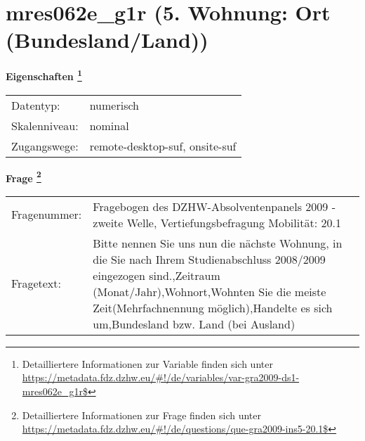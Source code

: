 
    \setcounter{footnote}{0}

    \vspace*{-1.8cm}
	\section{mres062e\_g1r (5. Wohnung: Ort (Bundesland/Land))}
	\label{section:mres062e_g1r}



    \vspace*{0.5cm}
    \noindent\textbf{Eigenschaften
	\footnote{Detailliertere Informationen zur Variable finden sich unter
		\url{https://metadata.fdz.dzhw.eu/\#!/de/variables/var-gra2009-ds1-mres062e_g1r$}}}\\
	\begin{tabularx}{\hsize}{@{}lX}
	Datentyp: & numerisch \\
	Skalenniveau: & nominal \\
	Zugangswege: &
	  remote-desktop-suf, 
	  onsite-suf
 \\
    \end{tabularx}



				\vspace*{0.5cm}
                \noindent\textbf{Frage
	                \footnote{Detailliertere Informationen zur Frage finden sich unter
		              \url{https://metadata.fdz.dzhw.eu/\#!/de/questions/que-gra2009-ins5-20.1$}}}\\
				\begin{tabularx}{\hsize}{@{}lX}
					Fragenummer: &
					  Fragebogen des DZHW-Absolventenpanels 2009 - zweite Welle, Vertiefungsbefragung Mobilität:
					  20.1
 \\
					Fragetext: & Bitte nennen Sie uns nun die nächste Wohnung, in die Sie nach Ihrem Studienabschluss 2008/2009 eingezogen sind.,Zeitraum (Monat/Jahr),Wohnort,Wohnten Sie die meiste Zeit(Mehrfachnennung möglich),Handelte es sich um,Bundesland bzw. Land (bei Ausland) \\
				\end{tabularx}





